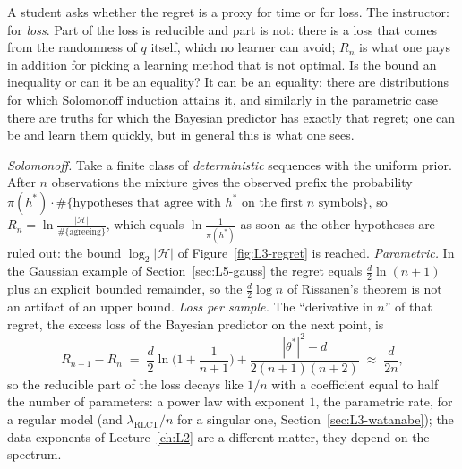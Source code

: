 \begin{discussion}
A student asks whether the regret is a proxy for time or for loss. The instructor: for \emph{loss}. Part of the loss is reducible and part is not: there is a loss that comes from the randomness of $q$ itself, which no learner can avoid; $R_n$ is what one pays in addition for picking a learning method that is not optimal. Is the bound an inequality or can it be an equality? It can be an equality: there are distributions for which Solomonoff induction attains it, and similarly in the parametric case there are truths for which the Bayesian predictor has exactly that regret; one can be  and learn them quickly, but in general this is what one sees.
\end{discussion}

\begin{beyond}
\emph{Solomonoff.} Take a finite class of \emph{deterministic} sequences with the uniform prior. After $n$ observations the mixture gives the observed prefix the probability $\pi(h^*)\cdot\#\{\text{hypotheses that agree with }h^*\text{ on the first }n\text{ symbols}\}$, so $R_n=\ln\frac{|\mathcal H|}{\#\{\text{agreeing}\}}$, which equals $\ln\frac1{\pi(h^*)}$ as soon as the other hypotheses are ruled out: the bound $\log_2|\mathcal H|$ of Figure~\ref{fig:L3-regret} is reached. \emph{Parametric.} In the Gaussian example of Section~\ref{sec:L5-gauss} the regret equals $\frac d2\ln(n+1)$ plus an explicit bounded remainder, so the $\frac d2\log n$ of Rissanen's theorem is not an artifact of an upper bound. \emph{Loss per sample.} The ``derivative in $n$'' of that regret, the excess loss of the Bayesian predictor on the next point, is
\[
  R_{n+1}-R_n\;=\;\frac d2\ln\Big(1+\frac1{n+1}\Big)+\frac{|\theta^*|^2-d}{2(n+1)(n+2)}\;\approx\;\frac d{2n},
\]
so the reducible part of the loss decays like $1/n$ with a coefficient equal to half the number of parameters: a power law with exponent $1$, the parametric rate, for a regular model (and $\lambda_{\mathrm{RLCT}}/n$ for a singular one, Section~\ref{sec:L3-watanabe}); the data exponents of Lecture~\ref{ch:L2} are a different matter, they depend on the spectrum.
\end{beyond}


